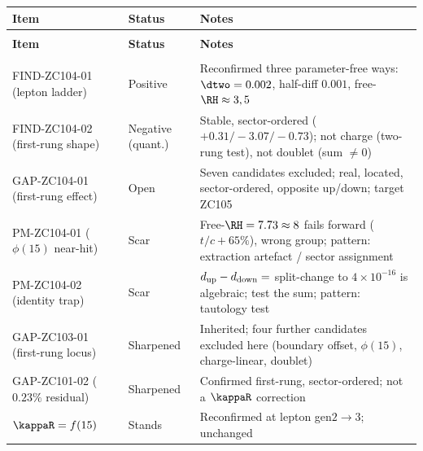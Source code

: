 \documentclass[12pt, a4paper]{article}
\begin{document}
{\small
\setlength{\LTpre}{4pt}\setlength{\LTpost}{4pt}
\renewcommand{\arraystretch}{1.30}
\begin{longtable}{>{\raggedright\arraybackslash}p{4.2cm}
                  >{\centering\arraybackslash}p{2.4cm}
                  >{\raggedright\arraybackslash}p{6.0cm}}
\toprule
\textbf{Item} & \textbf{Status} & \textbf{Notes} \\
\midrule
\endfirsthead
\multicolumn{3}{l}{\small\textit{(continued)}}\\[4pt]
\toprule\textbf{Item} & \textbf{Status} & \textbf{Notes}\\\midrule
\endhead
\midrule\multicolumn{3}{r}{\small\textit{(continues)}}\\
\endfoot
\bottomrule
\endlastfoot
FIND-ZC104-01 (lepton ladder) & Positive
  & Reconfirmed three parameter-free ways: $\dtwo=0.002$, half-diff $0.001$,
    free-$\RH\approx3,5$ \\[4pt]
FIND-ZC104-02 (first-rung shape) & Negative (quant.)
  & Stable, sector-ordered ($+0.31/{-}3.07/{-}0.73$); not charge (two-rung
    test), not doublet (sum $\neq0$) \\[4pt]
GAP-ZC104-01 (first-rung effect) & Open
  & Seven candidates excluded; real, located, sector-ordered, opposite up/down;
    target ZC105 \\[4pt]
PM-ZC104-01 ($\phi(15)$ near-hit) & Scar
  & Free-$\RH=7.73\approx8$ fails forward ($t/c+65\%$), wrong group; pattern:
    extraction artefact / sector assignment \\[4pt]
PM-ZC104-02 (identity trap) & Scar
  & $d_{\rm up}-d_{\rm down}=$ split-change to $4\!\times\!10^{-16}$ is algebraic;
    test the sum; pattern: tautology test \\[4pt]
\midrule
GAP-ZC103-01 (first-rung locus) & Sharpened
  & Inherited; four further candidates excluded here (boundary offset,
    $\phi(15)$, charge-linear, doublet) \\[4pt]
GAP-ZC101-02 ($0.23\%$ residual) & Sharpened
  & Confirmed first-rung, sector-ordered; not a $\kappaR$ correction \\[4pt]
$\kappaR=f(15)$ & Stands
  & Reconfirmed at lepton gen$2{\to}3$; unchanged \\
\end{longtable}
}
\end{document}
